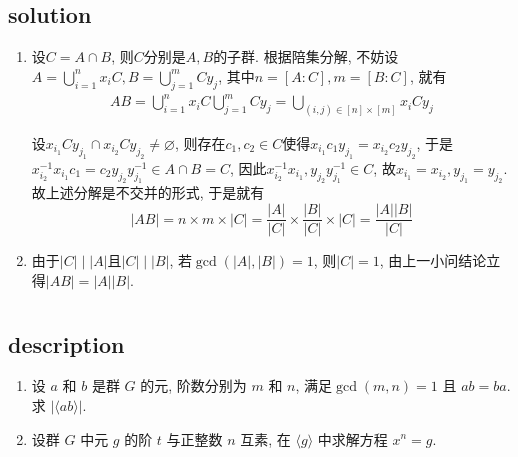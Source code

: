 \documentclass[UTF-8]{ctexart}
\begin{document}
\subsection{solution}
\begin{enumerate}
	\item 设$C = A \cap B$, 则$C$分别是$A, B$的子群. 根据陪集分解, 不妨设$A = \bigcup\limits_{i=1}^nx_iC, B = \bigcup\limits_{j=1}^mCy_j$, 其中$n = [A:C], m = [B:C]$, 就有
	\begin{align*}
		AB = \bigcup\limits_{i=1}^nx_iC\bigcup\limits_{j=1}^mCy_j = \bigcup_{(i, j) \in [n] \times [m]}x_iCy_j
	\end{align*}
	
	设$x_{i_1}Cy_{j_1} \cap x_{i_2}Cy_{j_2} \neq \varnothing$, 则存在$c_1, c_2 \in C$使得$x_{i_1}c_1y_{j_1} = x_{i_2}c_2y_{j_2}$, 于是$x_{i_2}^{-1}x_{i_1}c_1 = c_2y_{j_2}y_{j_1}^{-1} \in A \cap B = C$, 因此$x_{i_2}^{-1}x_{i_1}, y_{j_2}y_{j_1}^{-1} \in C$, 故$x_{i_1} = x_{i_2}, y_{j_1} = y_{j_2}$. 故上述分解是不交并的形式, 于是就有$$|AB| = n \times m \times |C| = \frac{|A|}{|C|}\times\frac{|B|}{|C|}\times |C| = \frac{|A||B|}{|C|}$$
	\item 由于$|C| \mid |A|$且$|C| \mid |B|$, 若$\gcd(|A|, |B|) = 1$, 则$|C| = 1$, 由上一小问结论立得$|AB| = |A||B|$.
\end{enumerate}

\section{}
\subsection{description}
\begin{enumerate}
	\item 设 $a$ 和 $b$ 是群 $G$ 的元, 阶数分别为 $m$ 和 $n$, 满足$\gcd(m, n) = 1$ 且 $ab = ba$. 求 $|\langle ab\rangle|$.
	\item 设群 $G$ 中元 $g$ 的阶 $t$ 与正整数 $n$ 互素, 在 $\langle g \rangle$ 中求解方程 $x^n = g$.
\end{enumerate}
\end{document}
